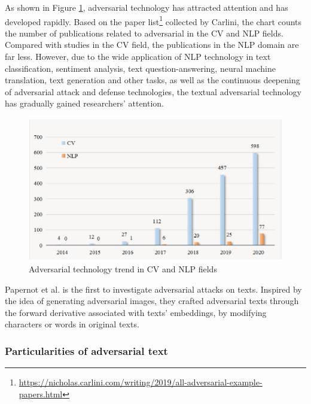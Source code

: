 As shown in Figure \ref{fig:2_2_adversarial_trend}, adversarial technology has attracted attention and has developed rapidly. Based on the paper list\footnote{\url{https://nicholas.carlini.com/writing/2019/all-adversarial-example-papers.html}} collected by Carlini, the chart counts
the number of publications related to adversarial in the CV and NLP fields. Compared with studies in the CV field, the publications in the NLP domain are far less. However, due to the wide application of NLP technology in text classification, sentiment analysis, text question-answering, neural machine translation, text generation and other tasks, as well as the continuous deepening of adversarial attack and defense technologies, the textual adversarial technology has gradually gained researchers' attention.

\begin{figure}
    \centering
    \includegraphics[width=0.8\linewidth]{images/2_2_papers.png}
    \caption{Adversarial technology trend in CV and NLP fields \cite{QIU2022278}}
    \label{fig:2_2_adversarial_trend}
\end{figure}

Papernot et al. \cite{journals/corr/PapernotMSH16} is the first to investigate adversarial attacks
on texts. Inspired by the idea of generating adversarial images, they crafted adversarial texts through the forward derivative associated with texts' embeddings, by modifying characters or words in original texts.


\subsubsection{Particularities of adversarial text}\label{subsubsec:particularities-of-adversarial-text}


